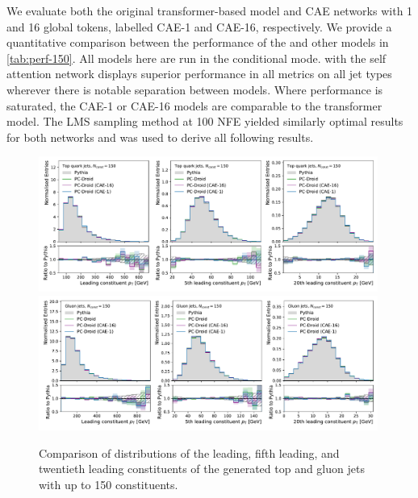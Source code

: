 We evaluate both the original transformer-based model and CAE networks with 1 and 16 global tokens, labelled CAE-1 and CAE-16, respectively.
We provide a quantitative comparison between the performance of the \pcdroid and other models in \cref{tab:perf-150}.
All models here are run in the conditional mode.
\pcdroid with the self attention network displays superior performance in all metrics on all jet types wherever there is notable separation between models.
Where performance is saturated, the CAE-1 or CAE-16 models are comparable to the transformer model.
The LMS sampling method at 100 NFE yielded similarly optimal results for both networks and was used to derive all following results.

\begin{figure}[tb]
    \centering
    \includegraphics[width=0.99\textwidth]{Figures/jet_generation/droid/150/csts/t/100/t_leading_constituents.pdf}
    \includegraphics[width=0.99\textwidth]{Figures/jet_generation/droid/150/csts/g/100/g_leading_constituents.pdf}
    \caption{Comparison of \pt distributions of the leading, fifth leading, and twentieth leading constituents of the generated top and gluon jets with up to 150 constituents.
    }
    \label{fig:const-pt_dist-150}
\end{figure}

